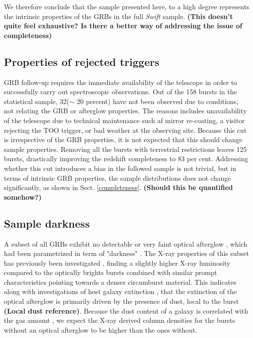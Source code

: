 \documentclass{aa}    %
\newcommand\todo[1]{\textbf{(#1)}}
\begin{document}
We therefore conclude that the sample presented here, to a high degree
represents the intrinsic properties of the GRBs in the full \textit{Swift} sample.
\todo{This doesn't quite feel exhaustive? Is there a better way of addressing the issue of completeness}

\subsection{Properties of rejected triggers} \label{badbursts}

GRB follow-up requires the immediate availability of the telescope in order to
successfully carry out spectroscopic observations. Out of the 158 bursts in the
statistical sample, 32($\sim$ 20 percent) have not been observed due to
conditions, not relating the GRB or afterglow properties. The reasons includes
unavailability of the telescope due to technical maintenance such af mirror
re-coating, a visitor rejecting the TOO trigger, or bad weather at the observing
site. Because this cut is irrespective of the GRB properties, it is not expected
that this should change sample properties. Removing all the bursts with
terrestrial restrictions leaves 125 bursts, drastically improving the redshift
completeness to 83 per cent. Addressing whether this cut introduces a bias in
the followed sample is not trivial, but in terms of intrinsic GRB properties,
the sample distributions does not change significantly, as shown in Sect.
\ref{completeness}. \todo{Should this be quantified somehow?}

\subsection{Sample darkness}

A subset of all GRBs exhibit no detectable or very faint optical afterglow
\citep{Groot1998, Djorgovski2001, Fynbo2001}, which had been parametrized in
term of "darkness" \citep{Jakobsson2004, VanderHorst2009}. The X-ray properties
of this subset has previously been investigated \citep{DePasquale2003, Fynbo2009,
	Melandri2012}, finding a slightly higher X-ray luminosity compared to the
optically brights bursts combined with similar prompt characteristics pointing
towards a denser circumburst material. This indicates along with investigations
of host galaxy extinction \citep{Greiner2011, Kruhler2011, Hjorth2012}, that the
extinction of the optical afterglow is primarily driven by the presence of dust,
local to the burst \todo{Local dust reference}. Because the dust content of a
galaxy is correlated with the gas amount \citep{Bohlin1978, Guver2009}, we
expect the X-ray derived column densities for the bursts without an optical
afterglow to be higher than the ones without.
\end{document}
